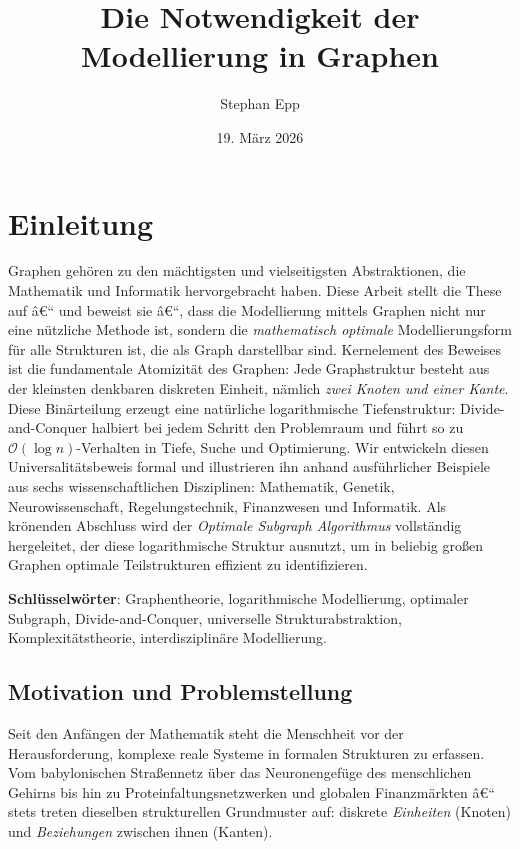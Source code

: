 ﻿\documentclass[12pt,a4paper,twoside]{article}
\title{\textbf{Die Notwendigkeit der \\Modellierung in Graphen}}
\author{Stephan Epp}
\date{19. März 2026}
\theoremstyle{definition}
\theoremstyle{plain}
\theoremstyle{remark}
\begin{document}

\maketitle

\tableofcontents
\newpage

\section{Einleitung}
\label{sec:einleitung}
Graphen gehören zu den mächtigsten und vielseitigsten Abstraktionen,
die Mathematik und Informatik hervorgebracht haben.  Diese Arbeit
stellt die These auf â€“ und beweist sie â€“, dass die Modellierung
mittels Graphen nicht nur eine nützliche Methode ist, sondern die
\emph{mathematisch optimale} Modellierungsform für alle Strukturen
ist, die als Graph darstellbar sind.  Kernelement des Beweises ist
die fundamentale Atomizität des Graphen: Jede Graphstruktur besteht
aus der kleinsten denkbaren diskreten Einheit, nämlich
\emph{zwei Knoten und einer Kante}.  Diese Binärteilung erzeugt
eine natürliche logarithmische Tiefenstruktur: Divide-and-Conquer
halbiert bei jedem Schritt den Problemraum und führt so zu
$\mathcal{O}(\log n)$-Verhalten in Tiefe, Suche und Optimierung.
Wir entwickeln diesen Universalitätsbeweis formal und illustrieren
ihn anhand ausführlicher Beispiele aus sechs wissenschaftlichen
Disziplinen: Mathematik, Genetik, Neurowissenschaft, Regelungs\-technik,
Finanzwesen und Informatik.  Als krönenden Abschluss wird der
\emph{Optimale Subgraph Algorithmus} vollständig hergeleitet,
der diese logarithmische Struktur ausnutzt, um in beliebig großen
Graphen optimale Teilstrukturen effizient zu identifizieren.

\textbf{Schlüsselwörter}: Graphentheorie, logarithmische Modellierung, optimaler Subgraph,
Divide-and-Conquer, universelle Strukturabstraktion,
Komplexitätstheorie, interdisziplinäre Modellierung.

\subsection{Motivation und Problemstellung}

Seit den Anfängen der Mathematik steht die Menschheit vor der
Herausforderung, komplexe reale Systeme in formalen Strukturen
zu erfassen.  Vom babylonischen Straßennetz über das Neuronengefüge
des menschlichen Gehirns bis hin zu Proteinfaltungsnetzwerken und
globalen Finanzmärkten â€“ stets treten dieselben strukturellen
Grundmuster auf: diskrete \emph{Einheiten} (Knoten) und
\emph{Beziehungen} zwischen ihnen (Kanten).
\end{document}
